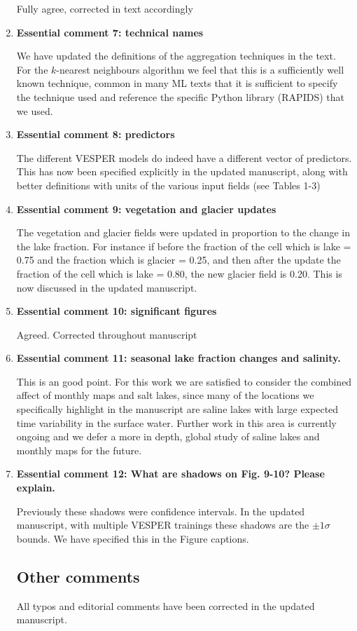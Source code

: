 \documentclass[10pt]{article}
\begin{document}
\begin{enumerate}
		Fully agree, corrected in text accordingly
		
		\item \textbf{Essential comment 7: technical names}
		
		We have updated the definitions of the aggregation techniques in the text. For the $k$-nearest neighbours algorithm we feel that this is a sufficiently well known technique, common in many ML texts that it is sufficient to  specify the technique used and reference the specific Python library (RAPIDS) that we used.
	
			\item \textbf{Essential comment 8: predictors}
			
			The different VESPER models do indeed have a different vector of predictors. This has now been specified explicitly in the updated manuscript, along with better definitions with units of the various input fields (see Tables 1-3)
			
			\item \textbf{Essential comment 9:  vegetation and glacier updates}
			
			The vegetation and glacier fields were updated in proportion to the change in the lake fraction. For instance if before the fraction of the cell which is lake = 0.75 and the fraction which is glacier = 0.25, and then after the update the fraction of the cell which is lake = 0.80, the new glacier field is 0.20. This is now discussed in the updated manuscript. 
			
			
			\item \textbf{Essential comment 10:  significant figures}
			
			Agreed. Corrected throughout manuscript
			
			
			
			\item \textbf{Essential comment 11: seasonal lake fraction changes and salinity.}
			
			This is an good point. For this work we are satisfied to consider the combined affect of monthly maps and salt lakes, since many of the locations we specifically highlight in the manuscript are saline lakes with large expected time variability in the surface water. Further work in this area is currently ongoing and we defer a more in depth, global study of saline lakes and monthly maps for the future. 
			
		
			\item \textbf{Essential comment 12: What are shadows on Fig. 9-10? Please explain.}
		
		 Previously these shadows were confidence intervals. In the updated manuscript, with multiple VESPER trainings these shadows are the $\pm 1 \sigma$ bounds. We have specified this in the Figure captions.
		 
		 
		 		
	\subsection*{Other comments}
	All typos and editorial comments have been corrected in the updated manuscript.
	
	
\end{enumerate}
\end{document}
